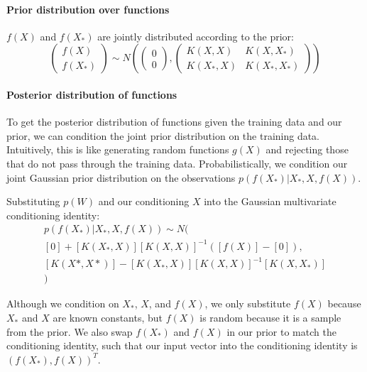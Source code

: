 \paragraph{Prior distribution over functions}
$f(X)$ and $f(X_*)$ are jointly distributed according to the prior:
\begin{equation*}
    \begin{pmatrix}
        f(X) \\ f(X_*)
    \end{pmatrix} \sim N\left(
    \begin{pmatrix}
        0 \\ 0
    \end{pmatrix},
    \begin{pmatrix}
        K(X,X) & K(X,X_*) \\ K(X_*,X) & K(X_*,X_*)
    \end{pmatrix}
    \right)
\end{equation*}

\paragraph{Posterior distribution of functions}
To get the posterior distribution of functions given the training data and our prior, we can condition the joint prior distribution on the training data. Intuitively, this is like generating random functions $g(X)$ and rejecting those that do not pass through the training data. Probabilistically, we condition our joint Gaussian prior distribution on the observations $p(f(X_*)|X_*, X, f(X))$.

Substituting $p(W)$ and our conditioning $X$ into the Gaussian multivariate conditioning identity:
\begin{equation*}
    \begin{aligned}
        p(f(X_*)|X_*, X, f(X)) \sim N( \\
        [0] + [K(X_*,X)][K(X,X)]^{-1}([f(X)] - [0]), \\
        [K(X*,X*)] - [K(X_*,X)][K(X,X)]^{-1}[K(X,X_*)] \\
        )
    \end{aligned}
\end{equation*}

Although we condition on $X_*$, $X$, and $f(X)$, we only substitute $f(X)$ because $X_*$ and $X$ are known constants, but $f(X)$ is random because it is a sample from the prior. We also swap $f(X_*)$ and $f(X)$ in our prior to match the conditioning identity, such that our input vector into the conditioning identity is $(f(X_*), f(X))^T$.
    
